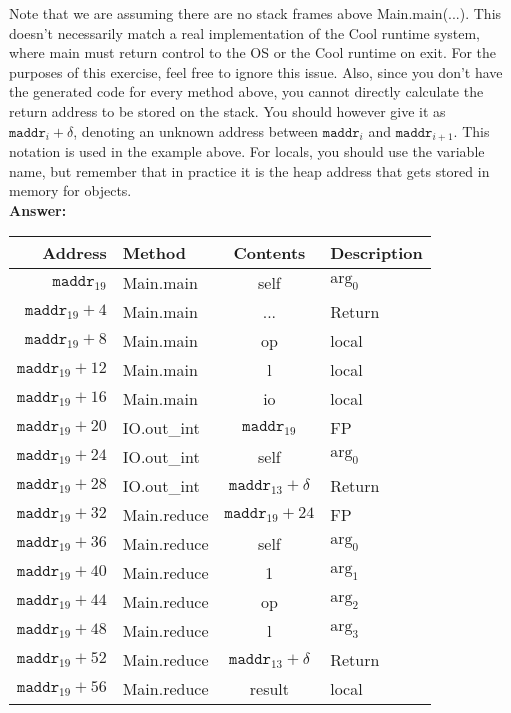 \documentclass[11pt]{article}
\begin{document}
\begin{enumerate}
\begin{enumerate}
    Note that we are assuming there are no stack frames above Main.main(...). This doesn't necessarily match a real implementation of the Cool runtime system, where main must return control to the OS or the Cool runtime on exit. For the purposes of this exercise, feel free to ignore this issue. Also, since you don't have the generated code for every method above, you cannot directly calculate the return address to be stored on the stack. You should however give it as $\mathtt{maddr}_{i}+\delta$, denoting an unknown address between $\mathtt{maddr}_{i}$ and $\mathtt{maddr}_{i+1}$. This notation is used in the example above. For locals, you should use the variable name, but remember that in practice it is the heap address that gets stored in memory for objects.\\
    \textbf{Answer:} \\
    \begin{tabular}{ | r | l | c | l | }
    \hline
    Address & Method & Contents & Description \\
    \hline
    $\mathtt{maddr}_{19}$ & Main.main & self & $\mbox{arg}_0$ \\
    \hline
    $\mathtt{maddr}_{19}+4$ & Main.main & ... & Return \\
    \hline
    $\mathtt{maddr}_{19}+8$ & Main.main & op & local \\
    \hline
    $\mathtt{maddr}_{19}+12$ & Main.main & l & local \\
    \hline
    $\mathtt{maddr}_{19}+16$ & Main.main & io & local \\
    \hline
    $\mathtt{maddr}_{19}+20$ & IO.out_int & $\mathtt{maddr}_{19}$ & FP \\
    \hline
    $\mathtt{maddr}_{19}+24$ & IO.out_int & self & $\mbox{arg}_0$ \\
	\hline
    $\mathtt{maddr}_{19}+28$ & IO.out_int & $\mathtt{maddr}_{13}+\delta$ & Return \\
    \hline
    $\mathtt{maddr}_{19}+32$ & Main.reduce & $\mathtt{maddr}_{19}+24$ & FP \\
    \hline
    $\mathtt{maddr}_{19}+36$ & Main.reduce & self & $\mbox{arg}_0$ \\
    \hline
    $\mathtt{maddr}_{19}+40$ & Main.reduce & 1 & $\mbox{arg}_1$ \\	
	\hline
    $\mathtt{maddr}_{19}+44$ & Main.reduce & op & $\mbox{arg}_2$ \\
	\hline
    $\mathtt{maddr}_{19}+48$ & Main.reduce & l & $\mbox{arg}_3$ \\
	\hline
    $\mathtt{maddr}_{19}+52$ & Main.reduce & $\mathtt{maddr}_{13}+\delta$ & Return \\
	\hline
    $\mathtt{maddr}_{19}+56$ & Main.reduce & result & local \\
    \hline
    \end{tabular} \\
    

\end{enumerate}
\end{enumerate}
\end{document}

